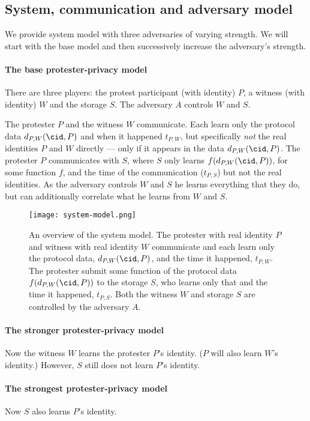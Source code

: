 \subsection{System, communication and adversary model}%
\label{adversary-model}

We provide system model with three adversaries of varying strength.
We will start with the base model and then successively increase the 
adversary's strength.

\paragraph{The base protester-privacy model}

There are three players: the protest participant (with identity) \(P\), a 
witness (with identity) \(W\) and the storage \(S\).
The adversary \(A\) controls \(W\) and \(S\).

The protester \(P\) and the witness \(W\) communicate.
Each learn only the protocol data \(d_{P,W}(\cid, P)\) and when it happened 
\(t_{P,W}\), but specifically \emph{not} the real identities \(P\) and \(W\) 
directly --- only if it appears in the data \(d_{P,W}(\cid, P)\).
The protester \(P\) communicates with \(S\), where \(S\) only learns 
\(f(d_{P,W}(\cid, P))\), for some function \(f\), and the time of the 
communication (\(t_{P,S}\)) but not the real identities.
As the adversary controls \(W\) and \(S\) he learns everything that they do, 
but can additionally correlate what he learns from \(W\) and \(S\).

\begin{figure}
  \centering
  \texttt{[image: system-model.png]}
  \caption{\label{fig:system-model}%
    An overview of the system model.
    The protester with real identity \(P\) and witness with real identity \(W\) 
    communicate and each learn only the protocol data, \(d_{P,W}(\cid, P)\), 
    and the time it happened, \(t_{P,W}\).
    The protester submit some function of the protocol data \(f(d_{P,W}(\cid, 
      P))\) to the storage \(S\), who learns only that and the time it 
    happened, \(t_{P,S}\).
    Both the witness \(W\) and storage \(S\) are controlled by the adversary 
    \(A\).
  }
\end{figure}

\paragraph{The stronger protester-privacy model}

Now the witness \(W\) learns the protester \(P\)'s identity.
(\(P\) will also learn \(W\)'s identity.)
However, \(S\) still does not learn \(P\)'s identity.

\paragraph{The strongest protester-privacy model}

Now \(S\) also learns \(P\)'s identity.

